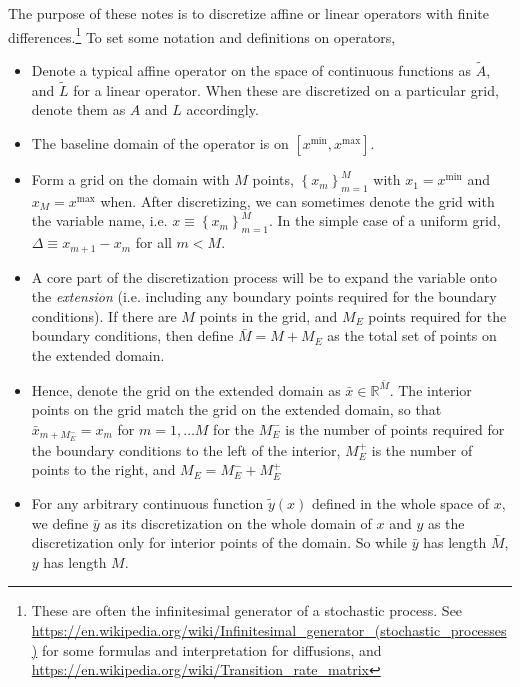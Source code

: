 \documentclass[11pt]{article}
\newcommand{\set}[1]{\ensuremath{\left\{{#1}\right\}}}
\newcommand{\R}{\ensuremath{\mathbb{R}}}
\begin{document}
	The purpose of these notes is to discretize affine or linear operators with finite differences.\footnote{These are often the infinitesimal generator of a stochastic process.  See \url{https://en.wikipedia.org/wiki/Infinitesimal_generator_(stochastic_processes)} for some formulas and interpretation for diffusions, and \url{https://en.wikipedia.org/wiki/Transition_rate_matrix}} To set some notation and definitions on operators,
	\begin{itemize}
		\item Denote a typical affine operator on the space of continuous functions as $\tilde{A}$, and $\tilde{L}$ for a linear operator.  When these are discretized on a particular grid, denote them as $A$ and $L$ accordingly.
		\item The baseline domain of the operator is on $[x^{\min}, x^{\max}]$.
		\item Form a grid on the domain with $M$ points, $\set{x_m}_{m=1}^{M}$ with $x_1 = x^{\min}$ and $x_{M} = x^{\max}$ when. After discretizing, we can sometimes denote the grid with the variable name, i.e. $x \equiv \set{x_m}_{m=1}^M$. In the simple case of a uniform grid, $\Delta \equiv x_{m+1} - x_m$ for all $m < M$.
		\item A core part of the discretization process will be to expand the variable onto the \textit{extension} (i.e. including any boundary points required for the boundary conditions).  If there are $M$ points in the grid, and $M_E$ points required for the boundary conditions, then define $\bar{M} = M + M_E$ as the total set of points on the extended domain.
		\item Hence, denote the grid on the extended domain as $\bar{x} \in \R^{\bar{M}}$.  The interior points on the grid match the grid on the extended domain, so that $\bar{x}_{m + M^{-}_E} = x_{m}$ for $m = 1, \ldots M$ for the $M^{-}_E$ is the number of points required for the boundary conditions to the left of the interior, $M^{+}_E$ is the number of points to the right, and $M_E = M^{-}_E + M^{+}_E$
		\item For any arbitrary continuous function $\tilde{y}(x)$ defined in the whole space of $x$, we define $\bar{y}$ as its discretization on the whole domain of $x$ and $y$ as the discretization only for interior points of the domain. So while $\bar{y}$ has length $\bar{M}$, $y$ has length $M$.
	\end{itemize}
\end{document}
